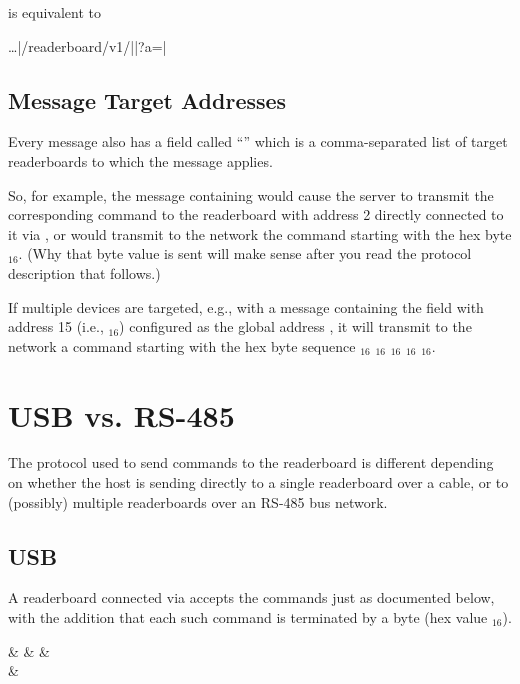 \noindent is equivalent to

\begin{Coding}
	\dots|/readerboard/v1/||?a=|
\end{Coding}

\subsection{Message Target Addresses}
Every message also has a field called ``'' which is a comma-separated list of target readerboards to which the message
applies.

So, for example, the message containing  would cause the server to transmit the corresponding command to the readerboard with address 2 directly connected to it via , or
would transmit to the  network the command starting with the hex byte $_{16}$. (Why that byte value is sent will make sense after you read the protocol
description that follows.)

If multiple devices are targeted, e.g., with a message containing the field  with address 15 (i.e., $_{16}$) configured as the global address ,
it will transmit to the  network a command starting with the hex byte sequence $_{16}$ $_{16}$ $_{16}$ $_{16}$ $_{16}$.
\section{USB vs. RS-485}
The protocol used to send commands to the readerboard is different depending on
whether the host is sending directly to a single readerboard over a 
cable, or to (possibly) multiple readerboards over an RS-485 bus network.

\subsection{USB}
A readerboard connected via  accepts the commands just as documented
below, with the addition that each such command is terminated by a 
 byte (hex value $_{16}$).
\begin{center}
\begin{bytefield}[endianness=little,bitwidth=0.11111\textwidth]{9}
	&
	&
	&
	\\
	&
\end{bytefield}
\end{center}

